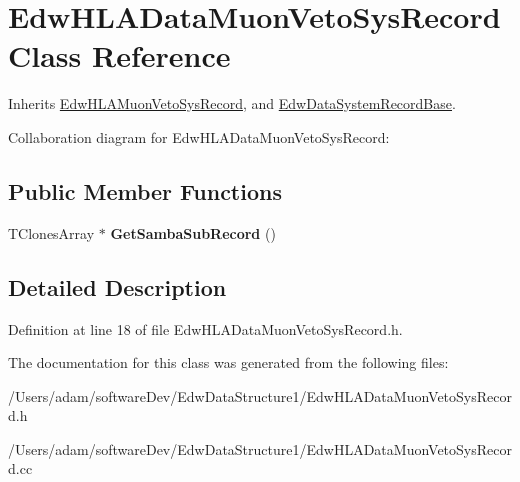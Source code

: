 \hypertarget{class_edw_h_l_a_data_muon_veto_sys_record}{
\section{EdwHLADataMuonVetoSysRecord Class Reference}
\label{class_edw_h_l_a_data_muon_veto_sys_record}
}


Inherits \hyperlink{class_edw_h_l_a_muon_veto_sys_record}{EdwHLAMuonVetoSysRecord}, and \hyperlink{class_edw_data_system_record_base}{EdwDataSystemRecordBase}.



Collaboration diagram for EdwHLADataMuonVetoSysRecord:\subsection*{Public Member Functions}
\begin{DoxyCompactItemize}
\item 
\hypertarget{class_edw_h_l_a_data_muon_veto_sys_record_ac803bcd3bb38811e62f388f08491cd93}{
TClonesArray $\ast$ {\bfseries GetSambaSubRecord} ()}
\label{class_edw_h_l_a_data_muon_veto_sys_record_ac803bcd3bb38811e62f388f08491cd93}

\end{DoxyCompactItemize}


\subsection{Detailed Description}


Definition at line 18 of file EdwHLADataMuonVetoSysRecord.h.



The documentation for this class was generated from the following files:\begin{DoxyCompactItemize}
\item 
/Users/adam/softwareDev/EdwDataStructure1/EdwHLADataMuonVetoSysRecord.h\item 
/Users/adam/softwareDev/EdwDataStructure1/EdwHLADataMuonVetoSysRecord.cc\end{DoxyCompactItemize}
